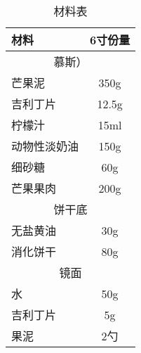 \begin{table}[h]
    \centering
    \begin{tabular}{|l||c|}\hline
     \textbf{材料}    &  \textbf{6寸份量}\\ \hline\hline
    \multicolumn{2}{|c|}{慕斯）}\\ \hline
    芒果泥     &  350g \\ \hline
    吉利丁片     &  12.5g \\ \hline
    柠檬汁  & 15ml  \\ \hline
    动物性淡奶油 &  150g  \\ \hline
    细砂糖     &  60g \\ \hline
    芒果果肉     & 200g  \\ \hline
    \multicolumn{2}{|c|}{饼干底}\\ \hline
    无盐黄油     &  30g \\ \hline
    消化饼干     &  80g \\ \hline
    \multicolumn{2}{|c|}{镜面}\\ \hline
    水     &  50g \\ \hline
    吉利丁片     &  5g \\ \hline
    果泥     &  2勺 \\ \hline
    \end{tabular}
    \caption{材料表}
\end{table}

